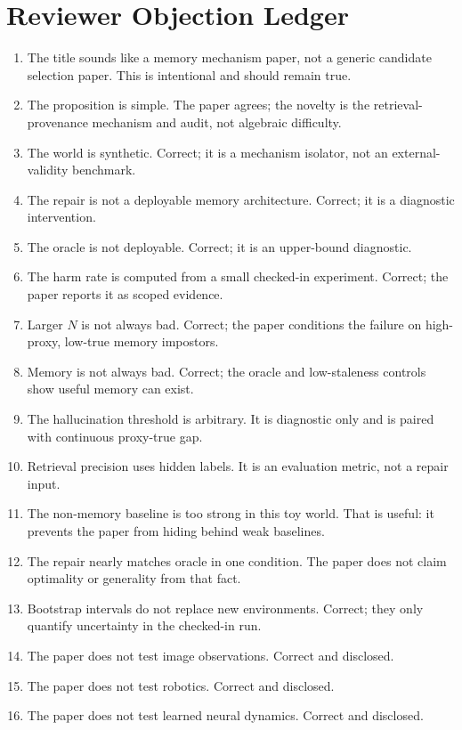 \documentclass{article}
\begin{document}
\section{Reviewer Objection Ledger}
\label{app:objection-ledger}

\begin{enumerate}
\item The title sounds like a memory mechanism paper, not a generic candidate
selection paper. This is intentional and should remain true.
\item The proposition is simple. The paper agrees; the novelty is the
retrieval-provenance mechanism and audit, not algebraic difficulty.
\item The world is synthetic. Correct; it is a mechanism isolator, not an
external-validity benchmark.
\item The repair is not a deployable memory architecture. Correct; it is a
diagnostic intervention.
\item The oracle is not deployable. Correct; it is an upper-bound diagnostic.
\item The harm rate is computed from a small checked-in experiment. Correct;
the paper reports it as scoped evidence.
\item Larger $N$ is not always bad. Correct; the paper conditions the failure
on high-proxy, low-true memory impostors.
\item Memory is not always bad. Correct; the oracle and low-staleness controls
show useful memory can exist.
\item The hallucination threshold is arbitrary. It is diagnostic only and is
paired with continuous proxy-true gap.
\item Retrieval precision uses hidden labels. It is an evaluation metric, not
a repair input.
\item The non-memory baseline is too strong in this toy world. That is useful:
it prevents the paper from hiding behind weak baselines.
\item The repair nearly matches oracle in one condition. The paper does not
claim optimality or generality from that fact.
\item Bootstrap intervals do not replace new environments. Correct; they only
quantify uncertainty in the checked-in run.
\item The paper does not test image observations. Correct and disclosed.
\item The paper does not test robotics. Correct and disclosed.
\item The paper does not test learned neural dynamics. Correct and disclosed.

\end{enumerate}
\end{document}
